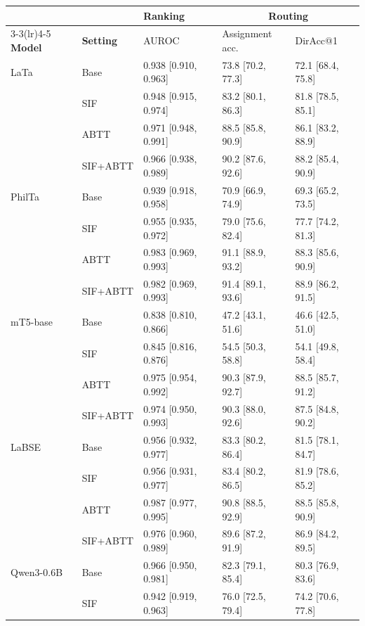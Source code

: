 \begin{table}[t]
\centering
\scriptsize
\setlength{\tabcolsep}{3pt}
\begin{tabular}{lllll}
\toprule
& & \textbf{Ranking} & \multicolumn{2}{c}{\textbf{Routing}} \\
\cmidrule(lr){3-3}\cmidrule(lr){4-5}
\textbf{Model} & \textbf{Setting} & AUROC & Assignment acc. & DirAcc@1 \\
\midrule
LaTa & Base & 0.938 [0.910, 0.963] & 73.8 [70.2, 77.3] & 72.1 [68.4, 75.8] \\
 & SIF & 0.948 [0.915, 0.974] & 83.2 [80.1, 86.3] & 81.8 [78.5, 85.1] \\
 & ABTT & 0.971 [0.948, 0.991] & 88.5 [85.8, 90.9] & 86.1 [83.2, 88.9] \\
 & SIF+ABTT & 0.966 [0.938, 0.989] & 90.2 [87.6, 92.6] & 88.2 [85.4, 90.9] \\
\addlinespace
PhilTa & Base & 0.939 [0.918, 0.958] & 70.9 [66.9, 74.9] & 69.3 [65.2, 73.5] \\
 & SIF & 0.955 [0.935, 0.972] & 79.0 [75.6, 82.4] & 77.7 [74.2, 81.3] \\
 & ABTT & 0.983 [0.969, 0.993] & 91.1 [88.9, 93.2] & 88.3 [85.6, 90.9] \\
 & SIF+ABTT & 0.982 [0.969, 0.993] & 91.4 [89.1, 93.6] & 88.9 [86.2, 91.5] \\
\addlinespace
mT5-base & Base & 0.838 [0.810, 0.866] & 47.2 [43.1, 51.6] & 46.6 [42.5, 51.0] \\
 & SIF & 0.845 [0.816, 0.876] & 54.5 [50.3, 58.8] & 54.1 [49.8, 58.4] \\
 & ABTT & 0.975 [0.954, 0.992] & 90.3 [87.9, 92.7] & 88.5 [85.7, 91.2] \\
 & SIF+ABTT & 0.974 [0.950, 0.993] & 90.3 [88.0, 92.6] & 87.5 [84.8, 90.2] \\
\addlinespace
LaBSE & Base & 0.956 [0.932, 0.977] & 83.3 [80.2, 86.4] & 81.5 [78.1, 84.7] \\
 & SIF & 0.956 [0.931, 0.977] & 83.4 [80.2, 86.5] & 81.9 [78.6, 85.2] \\
 & ABTT & 0.987 [0.977, 0.995] & 90.8 [88.5, 92.9] & 88.5 [85.8, 90.9] \\
 & SIF+ABTT & 0.976 [0.960, 0.989] & 89.6 [87.2, 91.9] & 86.9 [84.2, 89.5] \\
\addlinespace
Qwen3-0.6B & Base & 0.966 [0.950, 0.981] & 82.3 [79.1, 85.4] & 80.3 [76.9, 83.6] \\
 & SIF & 0.942 [0.919, 0.963] & 76.0 [72.5, 79.4] & 74.2 [70.6, 77.8] \\

\end{tabular}
\end{table}
